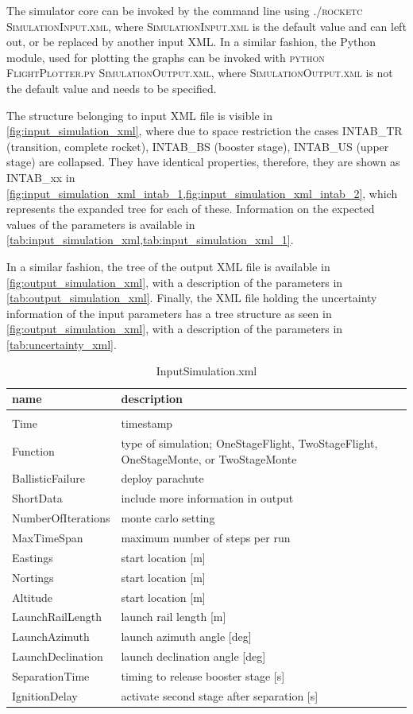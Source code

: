 \documentclass[11pt, a4paper]{article}
\newcommand{\loc}[1]{{\footnotesize \textsc{#1}}}
\begin{document}
The simulator core can be invoked by the command line using \loc{./rocketc SimulationInput.xml}, where \loc{SimulationInput.xml} is the default value and can left out, or be replaced by another input XML.
%
In a similar fashion, the Python module, used for plotting the graphs can be invoked with \loc{python FlightPlotter.py SimulationOutput.xml}, where \loc{SimulationOutput.xml} is not the default value and needs to be specified.

The structure belonging to input XML file is visible in \cref{fig:input_simulation_xml}, where due to space restriction the cases {INTAB\_TR} (transition, complete rocket), {INTAB\_BS} (booster stage), {INTAB\_US} (upper stage) are collapsed. They have identical properties, therefore, they are shown as {INTAB\_xx} in \cref{fig:input_simulation_xml_intab_1,fig:input_simulation_xml_intab_2}, which represents the expanded tree for each of these.
Information on the expected values of the parameters is available in \cref{tab:input_simulation_xml,tab:input_simulation_xml_1}.

In a similar fashion, the tree of the output XML file is available in \cref{fig:output_simulation_xml}, with a description of the parameters in \cref{tab:output_simulation_xml}.
Finally, the XML file holding the uncertainty information of the input parameters has a tree structure as seen in \cref{fig:output_simulation_xml}, with a description of the parameters in \cref{tab:uncertainty_xml}.

\begin{table}
  \centering
  \caption{InputSimulation.xml}
  \label{tab:input_simulation_xml}
  \begin{tabular}{l p{8cm}}
    \textbf{name} & \textbf{description} \\
    \hline \\
    Time & timestamp \\
    Function & type of simulation; OneStageFlight, TwoStageFlight,  OneStageMonte, or TwoStageMonte \\
    BallisticFailure & deploy parachute \\
    ShortData & include more information in output \\
    NumberOfIterations & monte carlo setting \\
    MaxTimeSpan & maximum number of steps per run \\
    Eastings & start location [m] \\
    Nortings & start location [m] \\
    Altitude & start location [m] \\
    LaunchRailLength & launch rail length [m] \\
    LaunchAzimuth & launch azimuth angle [deg] \\
    LaunchDeclination & launch declination angle [deg] \\
    SeparationTime & timing to release booster stage [s] \\
    IgnitionDelay & activate second stage after separation [s] \\
  \end{tabular}
\end{table}
\end{document}
